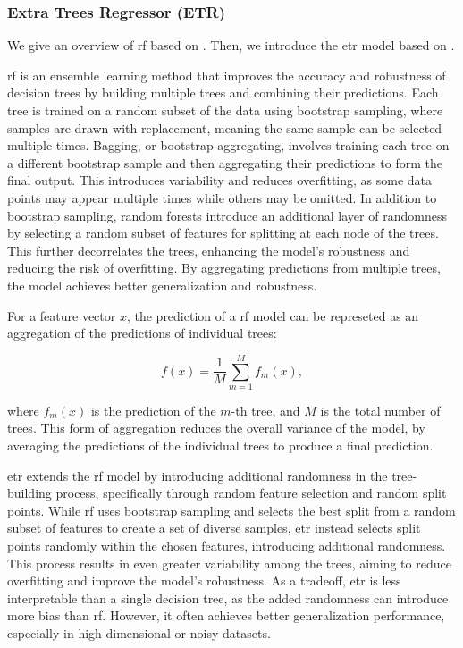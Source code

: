 \subsubsection{Extra Trees Regressor (ETR)}
We give an overview of \gls{rf} based on \citet{James2023AnIS}.
Then, we introduce the \gls{etr} model based on \citet{geurtsERF}.

\gls{rf} is an ensemble learning method that improves the accuracy and robustness of decision trees by building multiple trees and combining their predictions.
Each tree is trained on a random subset of the data using bootstrap sampling, where samples are drawn with replacement, meaning the same sample can be selected multiple times.
Bagging, or bootstrap aggregating, involves training each tree on a different bootstrap sample and then aggregating their predictions to form the final output.
This introduces variability and reduces overfitting, as some data points may appear multiple times while others may be omitted.
In addition to bootstrap sampling, random forests introduce an additional layer of randomness by selecting a random subset of features for splitting at each node of the trees.
This further decorrelates the trees, enhancing the model's robustness and reducing the risk of overfitting.
By aggregating predictions from multiple trees, the model achieves better generalization and robustness.

For a feature vector $x$, the prediction of a \gls{rf} model can be represeted as an aggregation of the predictions of individual trees:

$$
f(x) = \frac{1}{M} \sum_{m=1}^{M} f_m(x),
$$

where $f_m(x)$ is the prediction of the $m$-th tree, and $M$ is the total number of trees.
This form of aggregation reduces the overall variance of the model, by averaging the predictions of the individual trees to produce a final prediction.

\gls{etr} extends the \gls{rf} model by introducing additional randomness in the tree-building process, specifically through random feature selection and random split points.
While \gls{rf} uses bootstrap sampling and selects the best split from a random subset of features to create a set of diverse samples, \gls{etr} instead selects split points randomly within the chosen features, introducing additional randomness.
This process results in even greater variability among the trees, aiming to reduce overfitting and improve the model's robustness.
As a tradeoff, \gls{etr} is less interpretable than a single decision tree, as the added randomness can introduce more bias than \gls{rf}.
However, it often achieves better generalization performance, especially in high-dimensional or noisy datasets.
